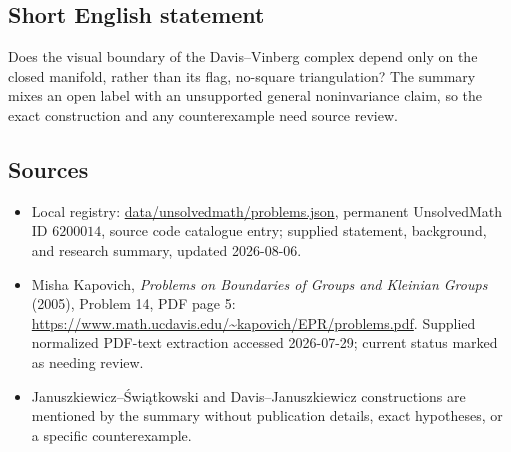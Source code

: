 \documentclass[11pt]{article}
\begin{document}
\subsection{Short English statement}
Does the visual boundary of the Davis--Vinberg complex depend only on the closed manifold, rather than its flag, no-square triangulation? The summary mixes an open label with an unsupported general noninvariance claim, so the exact construction and any counterexample need source review.
\subsection{Sources}
\begin{itemize}
\item Local registry: \url{data/unsolvedmath/problems.json}, permanent UnsolvedMath ID \(6200014\), source code catalogue entry; supplied statement, background, and research summary, updated 2026-08-06.
\item Misha Kapovich, \emph{Problems on Boundaries of Groups and Kleinian Groups} (2005), Problem 14, PDF page 5: \url{https://www.math.ucdavis.edu/~kapovich/EPR/problems.pdf}. Supplied normalized PDF-text extraction accessed 2026-07-29; current status marked as needing review.
\item Januszkiewicz--Świątkowski and Davis--Januszkiewicz constructions are mentioned by the summary without publication details, exact hypotheses, or a specific counterexample.
\end{itemize}
\end{document}
